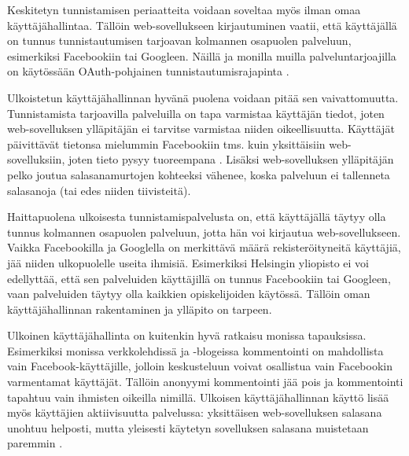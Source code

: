 Keskitetyn tunnistamisen periaatteita voidaan soveltaa myös ilman omaa käyttäjähallintaa. Tällöin web-sovellukseen kirjautuminen vaatii, että käyttäjällä on tunnus tunnistautumisen tarjoavan kolmannen osapuolen palveluun, esimerkiksi Facebookiin tai Googleen. Näillä ja monilla muilla palveluntarjoajilla on käytössään OAuth-pohjainen tunnistautumisrajapinta \cite{inside_the_identity_management_game}.

Ulkoistetun käyttäjähallinnan hyvänä puolena voidaan pitää sen vaivattomuutta. Tunnistamista tarjoavilla palveluilla on tapa varmistaa käyttäjän tiedot, joten web-sovelluksen ylläpitäjän ei tarvitse varmistaa niiden oikeellisuutta. Käyttäjät päivittävät tietonsa mielummin Facebookiin tms. kuin yksittäisiin web-sovelluksiin, joten tieto pysyy tuoreempana \cite{inside_the_identity_management_game}. Lisäksi web-sovelluksen ylläpitäjän pelko joutua salasanamurtojen kohteeksi vähenee, koska palveluun ei tallenneta salasanoja (tai edes niiden tiivisteitä).

Haittapuolena ulkoisesta tunnistamispalvelusta on, että käyttäjällä täytyy olla tunnus kolmannen osapuolen palveluun, jotta hän voi kirjautua web-sovellukseen. Vaikka Facebookilla ja Googlella on merkittävä määrä rekisteröityneitä käyttäjiä, jää niiden ulkopuolelle useita ihmisiä. Esimerkiksi Helsingin yliopisto ei voi edellyttää, että sen palveluiden käyttäjillä on tunnus Facebookiin tai Googleen, vaan palveluiden täytyy olla kaikkien opiskelijoiden käytössä. Tällöin oman käyttäjähallinnan rakentaminen ja ylläpito on tarpeen.

Ulkoinen käyttäjähallinta on kuitenkin hyvä ratkaisu monissa tapauksissa. Esimerkiksi monissa verkkolehdissä ja -blogeissa kommentointi on mahdollista vain Fa\-ce\-book-käyt\-tä\-jil\-le, jolloin keskusteluun voivat osallistua vain Facebookin varmentamat käyttäjät. Tällöin anonyymi kommentointi jää pois ja kommentointi tapahtuu vain ihmisten oikeilla nimillä. Ulkoisen käyttäjähallinnan käyttö lisää myös käyttäjien aktiivisuutta palvelussa: yksittäisen web-sovelluksen salasana unohtuu helposti, mutta yleisesti käytetyn sovelluksen salasana muistetaan paremmin \cite{password_habits}.